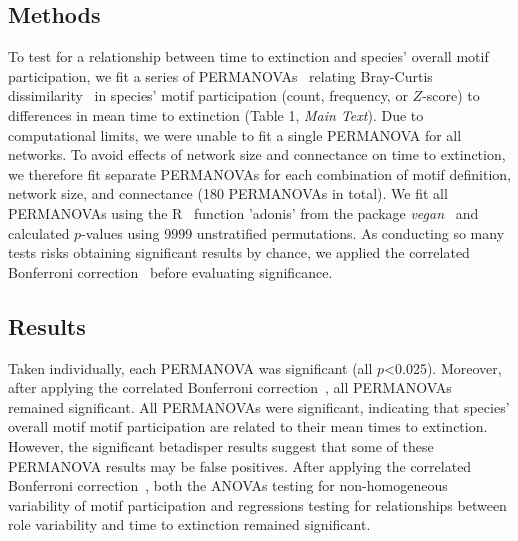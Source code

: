 \documentclass[12pt]{article}
\begin{document}
\begin{spacing}{2.0}
	\subsection*{Methods}


		To test for a relationship between time to extinction and species' overall motif participation, we fit a series of PERMANOVAs~\citep{Anderson2001} relating Bray-Curtis dissimilarity~\citep{Baker2015,Cirtwill2015} in species' motif participation (count, frequency, or $Z$-score) to differences in mean time to extinction (Table 1, \emph{Main Text}).
		Due to computational limits, we were unable to fit a single PERMANOVA for all networks.
		To avoid effects of network size and connectance on time to extinction, we therefore fit separate PERMANOVAs for each combination of motif definition, network size, and connectance (180 PERMANOVAs in total).
		We fit all PERMANOVAs using the R~\citep{R} function 'adonis' from the package \emph{vegan}~\citep{vegan} and calculated $p$-values using 9999 unstratified permutations.
		As conducting so many tests risks obtaining significant results by chance, we applied the correlated Bonferroni correction~\citep{Drezner2016} before evaluating significance.

	\subsection*{Results}


		Taken individually, each PERMANOVA was significant (all $p$\textless0.025). Moreover, after applying the correlated Bonferroni correction~\citep{Drezner2016}, all PERMANOVAs remained significant.
		All PERMANOVAs were significant, indicating that species' overall motif motif participation are related to their mean times to extinction.
		However, the significant betadisper results suggest that some of these PERMANOVA results may be false positives.
		After applying the correlated Bonferroni correction~\citep{Drezner2016}, both the ANOVAs testing for non-homogeneous variability of motif participation and regressions testing for relationships between role variability and time to extinction remained significant.



\end{spacing}
\end{document}
